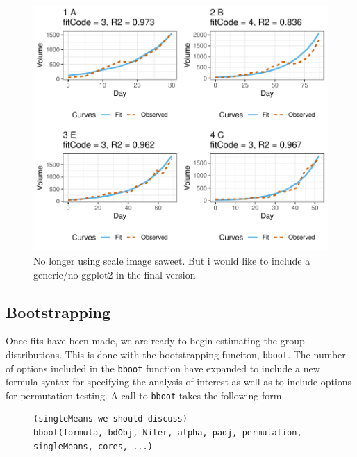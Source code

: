 \documentclass{article}
\newcommand{\xt}{\texttt}%
\begin{document}
\begin{figure}[H]
\centering
\includegraphics{img/mouse_fit.pdf}
\caption{No longer using scale image saweet. But i would like to include a generic/no ggplot2 in the final version}
\label{fig:plot_fits}
\end{figure}

\subsection{Bootstrapping}

Once fits have been made, we are ready to begin estimating the group distributions. This is done with the bootstrapping funciton, \xt{bboot}. The number of options included in the \xt{bboot} function have expanded to include a new formula syntax for specifying the analysis of interest as well as to include options for permutation testing. A call to \xt{bboot} takes the following form

\begin{singlespace}
\begin{figure}[H]
\centering
\begin{BVerbatim}
(singleMeans we should discuss)
bboot(formula, bdObj, Niter, alpha, padj, permutation, singleMeans, cores, ...)
\end{BVerbatim}
\end{figure}
\end{singlespace}
\end{document}
